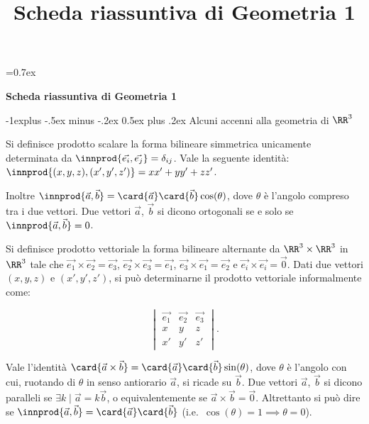 \documentclass[10pt,landscape]{article}
\title{Scheda riassuntiva di Geometria 1}
\makeatletter
\renewcommand{\subsection}{\@startsection{subsection}{2}{0mm}%
	{-1explus -.5ex minus -.2ex}%
	{0.5ex plus .2ex}%
	{\normalfont\normalsize\bfseries}}
\makeatother
\begin{document}
	
	\parskip=0.7ex
	
	\raggedright
	\footnotesize
	
	\begin{center}
		\Large{\textbf{Scheda riassuntiva di Geometria 1}} \\
	\end{center}
	\begin{multicols}{3}
		\setlength{\premulticols}{1pt}
		\setlength{\postmulticols}{1pt}
		\setlength{\multicolsep}{1pt}
		\setlength{\columnsep}{2pt}
		
		\subsection{Alcuni accenni alla geometria di \texorpdfstring{$\RR^3$}{R\^{}3}}
		
		Si definisce prodotto scalare la forma
		bilineare simmetrica unicamente determinata da $\innprod{\vec{e_i}, \vec{e_j}} = \delta_{ij}$. Vale la seguente identità: $\innprod{(x, y, z), (x', y', z')} = xx' + yy' + zz'$.
		
		Inoltre $\innprod{\vec{a}, \vec{b}} = \card{\vec{a}} \card{\vec{b}} \cos(\theta)$, dove $\theta$ è l'angolo compreso tra i due vettori.
		Due vettori $\vec{a}$, $\vec{b}$ si dicono ortogonali
		se e solo se $\innprod{\vec{a}, \vec{b}} = 0$.
		
		Si definisce prodotto vettoriale la forma bilineare alternante
		da $\RR^3 \times \RR^3$
		in $\RR^3$ tale che $\vec{e_1} \times \vec{e_2} = \vec{e_3}$,
		$\vec{e_2} \times \vec{e_3} = \vec{e_1}$,
		$\vec{e_3} \times \vec{e_1} = \vec{e_2}$ e
		$\vec{e_i} \times \vec{e_i} = \vec{0}$. Dati due
		vettori $(x, y, z)$ e $(x', y', z')$, si può determinarne
		il prodotto vettoriale informalmente come:
		
		\[ \begin{vmatrix}
			\vec{e_1} & \vec{e_2} & \vec{e_3} \\
			x & y & z \\
			x' & y' & z'
		\end{vmatrix} . \]
		
		Vale l'identità $\card{\vec{a} \times \vec{b}} = \card{\vec{a}} \card{\vec{b}} \sin(\theta)$, dove $\theta$ è l'angolo con cui, ruotando di
		$\theta$ in senso antiorario $\vec{a}$, si ricade su $\vec{b}$.
		Due vettori $\vec{a}$, $\vec{b}$ si dicono paralleli se $\exists
		k \mid \vec{a} = k \vec{b}$, o equivalentemente se
		$\vec{a} \times \vec{b} = \vec{0}$. Altrettanto si può dire
		se $\innprod{\vec{a}, \vec{b}} = \card{\vec{a}} \card{\vec{b}}$
		(i.e.~$\cos(\theta) = 1 \implies \theta = 0$).
		

\end{multicols}
\end{document}
